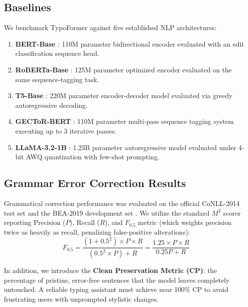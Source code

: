 \documentclass[10pt,journal,compsoc]{IEEEtran}
\begin{document}
\subsection{Baselines}
We benchmark TypoFormer against five established NLP architectures:
\begin{enumerate}
    \item \textbf{BERT-Base} \cite{devlin2018bert}: 110M parameter bidirectional encoder evaluated with an edit classification sequence head.
    \item \textbf{RoBERTa-Base} \cite{liu2019roberta}: 125M parameter optimized encoder evaluated on the same sequence-tagging task.
    \item \textbf{T5-Base} \cite{raffel2020t5}: 220M parameter encoder-decoder model evaluated via greedy autoregressive decoding.
    \item \textbf{GECToR-BERT} \cite{omelianchuk2020gector}: 110M parameter multi-pass sequence tagging system executing up to 3 iterative passes.
    \item \textbf{LLaMA-3.2-1B} \cite{touvron2023llama}: 1.23B parameter autoregressive model evaluated under 4-bit AWQ quantization with few-shot prompting.
\end{enumerate}

\subsection{Grammar Error Correction Results}
Grammatical correction performance was evaluated on the official CoNLL-2014 test set \cite{ng2014conll} and the BEA-2019 development set \cite{bryant2019bea}. We utilize the standard $M^2$ scorer \cite{dahlmeier2012better} reporting Precision ($P$), Recall ($R$), and $F_{0.5}$ metric (which weights precision twice as heavily as recall, penalizing false-positive alterations):
\begin{equation}
F_{0.5} = \frac{(1 + 0.5^2) \times P \times R}{(0.5^2 \times P) + R} = \frac{1.25 \times P \times R}{0.25P + R}
\end{equation}

In addition, we introduce the \textbf{Clean Preservation Metric (CP)}: the percentage of pristine, error-free sentences that the model leaves completely untouched. A reliable typing assistant must achieve near 100\% CP to avoid frustrating users with unprompted stylistic changes.
\end{document}
